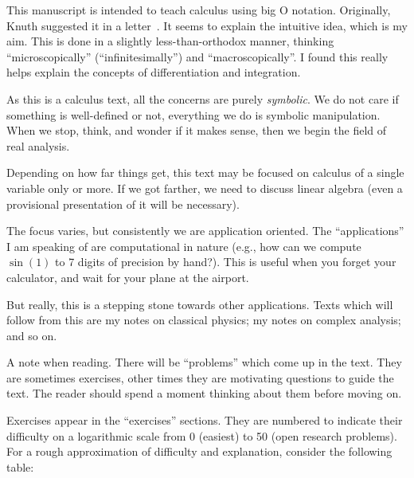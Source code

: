 This manuscript is intended to teach calculus using big O
notation. Originally, Knuth suggested it in a letter~\cite{knuth}. It seems
to explain the intuitive idea, which is my aim. This is done in a
slightly less-than-orthodox manner, thinking ``microscopically''
(``infinitesimally'') and ``macroscopically''. I found this
really helps explain the concepts of differentiation and
integration.

As this is a calculus text, all the concerns are purely
\emph{symbolic}. We do not care if something is well-defined or
not, everything we do is symbolic manipulation. When we stop,
think, and wonder if it makes sense, then we begin the field of
real analysis. 

Depending on how far things get, this text may be focused on
calculus of a single variable only or more. If we got farther, we
need to discuss linear algebra (even a provisional presentation
of it will be necessary). 

The focus varies, but consistently we are application
oriented. The ``applications'' I am speaking of are computational
in nature (e.g., how can we compute $\sin(1)$ to 7 digits of
precision by hand?). This is useful when you forget your
calculator, and wait for your plane at the airport.

But really, this is a stepping stone towards other
applications. Texts which will follow from this are my notes on
classical physics; my notes on complex analysis; and so on.

\bigskip
A note when reading. There will be ``problems'' which come up in
the text. They are sometimes exercises, other times they are
motivating questions to guide the text. The reader should spend a
moment thinking about them before moving on.

Exercises appear in the ``exercises'' sections. They are numbered
to indicate their difficulty on a logarithmic scale from 0
(easiest) to 50 (open research problems). For a rough
approximation of difficulty and explanation, consider the
following table:

